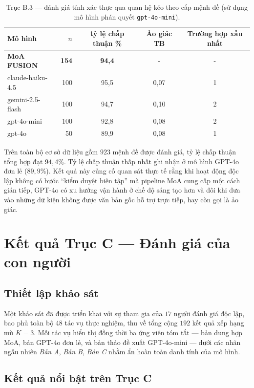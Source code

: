 \begin{table}[H]
  \centering
  \caption{Trục B.3 --- đánh giá tính xác thực qua quan hệ kéo theo cấp mệnh đề (sử dụng mô hình phán quyết \texttt{gpt-4o-mini}).}
  \label{tab:axisB3}
  \begin{tabularx}{\linewidth}{X r C C C}
    \toprule
    Mô hình & $n$ & tỷ lệ chấp thuận \% & Ảo giác TB & Trường hợp xấu nhất \\
    \midrule
    \textbf{MoA FUSION}            & \textbf{154} & \textbf{94,4} & - & - \\
    claude-haiku-4.5             & 100 & 95,5 & 0,07 & 1 \\
    gemini-2.5-flash             & 100 & 94,7 & 0,10 & 2 \\
    gpt-4o-mini                  & 100 & 92,8 & 0,08 & 2 \\
    gpt-4o          & 50  & 89,9 & 0,08 & 1 \\
    \bottomrule
  \end{tabularx}
\end{table}

Trên toàn bộ cơ sở dữ liệu gồm $923$ mệnh đề được đánh giá, tỷ lệ chấp thuận tổng hợp đạt $94,4\%$. Tỷ lệ chấp thuận thấp nhất ghi nhận ở mô hình GPT-4o đơn lẻ ($89,9\%$). Kết quả này củng cố quan sát thực tế rằng khi hoạt động độc lập không có bước ``kiểm duyệt biên tập'' mà pipeline MoA cung cấp một cách gián tiếp, GPT-4o có xu hướng vận hành ở chế độ sáng tạo hơn và đôi khi đưa vào những dữ kiện không được văn bản gốc hỗ trợ trực tiếp, hay còn gọi là ảo giác.

\section{Kết quả Trục C --- Đánh giá của con người}

\subsection{Thiết lập khảo sát}

Một khảo sát đã được triển khai với sự tham gia của $17$ người đánh giá độc lập, bao phủ toàn bộ $48$ tác vụ thực nghiệm, thu về tổng cộng $192$ kết quả xếp hạng mù $K = 3$. Mỗi tác vụ hiển thị đồng thời ba ứng viên tóm tắt --- bản dung hợp MoA, bản GPT-4o đơn lẻ, và bản thảo đề xuất GPT-4o-mini --- dưới các nhãn ngẫu nhiên \textit{Bản A}, \textit{Bản B}, \textit{Bản C} nhằm ẩn hoàn toàn danh tính của mô hình.

\subsection{Kết quả nổi bật trên Trục C}

